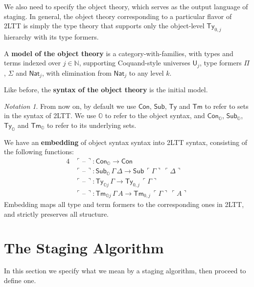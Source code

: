 \documentclass[acmsmall]{acmart}
\newcommand{\msf}[1]{\mathsf{#1}}
\newcommand{\mbb}[1]{\mathbb{#1}}
\newcommand{\mbbo}{\mbb{O}}
\newcommand{\ob}{_\mbbo}
\renewcommand{\U}{\msf{U}}
\newcommand{\Con}{\msf{Con}}
\newcommand{\Sub}{\msf{Sub}}
\newcommand{\Ty}{\msf{Ty}}
\newcommand{\Tm}{\msf{Tm}}
\newcommand{\Nat}{\msf{Nat}}
\newcommand{\blank}{{\mathord{\hspace{1pt}\text{--}\hspace{1pt}}}}
\newcommand{\emb}[1]{\ulcorner#1\urcorner}
\theoremstyle{remark}
\newtheorem{notation}{Notation}
\begin{document}
We also need to specify the object theory, which serves as the output language
of staging. In general, the object theory corresponding to a particular flavor
of 2LTT is simply the type theory that supports only the object-level $\Ty_{0,j}$
hierarchy with its type formers.

\begin{definition}
A \textbf{model of the object theory} is a category-with-families, with types and
terms indexed over $j \in \mbb{N}$, supporting Coquand-style universes $\U_j$,
type formers $\Pi$, $\Sigma$ and $\Nat_j$, with elimination from $\Nat_j$ to
any level $k$.
\end{definition}

\begin{definition}
Like before, the \textbf{syntax of the object theory} is the initial model.
\end{definition}

\begin{notation}
From now on, by default we use $\Con$, $\Sub$, $\Ty$ and $\Tm$ to refer to sets
in the syntax of 2LTT. We use $\mbbo$ to refer to the object syntax, and
$\Con\ob$, $\Sub\ob$, $\Ty\ob$ and $\Tm\ob$ to refer to its underlying sets.
\end{notation}

\begin{definition}
We have an \textbf{embedding} of object syntax syntax into 2LTT syntax, consisting
of the following functions:
\begin{alignat*}{4}
  & \emb{\blank} : \Con\ob \to \Con\\
  & \emb{\blank} : \Sub\ob\,\Gamma\,\Delta \to \Sub\,\emb{\Gamma}\,\emb{\Delta}\\
  & \emb{\blank} : \Ty_{\mbbo j}\,\Gamma \to \Ty_{0,j}\,\emb{\Gamma}\\
  & \emb{\blank} : \Tm_{\mbbo j}\,\Gamma\,A \to \Tm_{0,j}\,\emb{\Gamma}\,\emb{A}
\end{alignat*}
Embedding maps all type and term formers to the corresponding ones in 2LTT, and
strictly preserves all structure.
\end{definition}

\section{The Staging Algorithm}\label{sec:staging-algorithm}

In this section we specify what we mean by a staging algorithm, then proceed to
define one.
\end{document}
